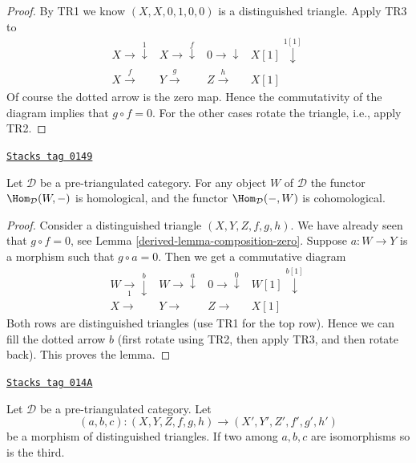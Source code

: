 \begin{proof}
By TR1 we know $(X, X, 0, 1, 0, 0)$ is a distinguished triangle.
Apply TR3 to
$$
\begin{array}{cccc}X \longrightarrow\overset{1}{\downarrow} & X \longrightarrow\overset{f}{\downarrow} & 0 \longrightarrow\downarrow & X[1] \overset{1[1]}{\downarrow} \\ X \overset{f}{\longrightarrow} & Y \overset{g}{\longrightarrow} & Z \overset{h}{\longrightarrow} & X[1]\end{array}
$$
Of course the dotted arrow is the zero map. Hence the commutativity of
the diagram implies that $g \circ f = 0$. For the other cases
rotate the triangle, i.e., apply TR2.
\end{proof}

\begin{lemma}
\label{derived-lemma-representable-homological}
\href{https://stacks.math.columbia.edu/tag/0149}{\texttt{Stacks tag 0149}}

Let $\mathcal{D}$ be a pre-triangulated category.
For any object $W$ of $\mathcal{D}$ the functor
$\Hom_\mathcal{D}(W, -)$ is homological, and the functor
$\Hom_\mathcal{D}(-, W)$ is cohomological.
\end{lemma}

\begin{proof}

Consider a distinguished triangle $(X, Y, Z, f, g, h)$.
We have already seen that $g \circ f = 0$, see
Lemma \ref{derived-lemma-composition-zero}.
Suppose $a : W \to Y$ is a morphism such that $g \circ a = 0$.
Then we get a commutative diagram
$$
\begin{array}{cccc}W \underset{1}{\longrightarrow}\overset{b}{\downarrow} & W \longrightarrow\overset{a}{\downarrow} & 0 \longrightarrow\overset{0}{\downarrow} & W[1] \overset{b[1]}{\downarrow} \\ X \longrightarrow & Y \longrightarrow & Z \longrightarrow & X[1]\end{array}
$$
Both rows are distinguished triangles (use TR1 for the top row).
Hence we can fill the dotted arrow $b$ (first rotate using TR2,
then apply TR3, and then rotate back). This proves the lemma.
\end{proof}

\begin{lemma}
\label{derived-lemma-third-isomorphism-triangle}
\href{https://stacks.math.columbia.edu/tag/014A}{\texttt{Stacks tag 014A}}

Let $\mathcal{D}$ be a pre-triangulated category.
Let
$$
(a, b, c) : (X, Y, Z, f, g, h) \to (X', Y', Z', f', g', h')
$$
be a morphism of distinguished triangles. If two among $a, b, c$
are isomorphisms so is the third.
\end{lemma}

